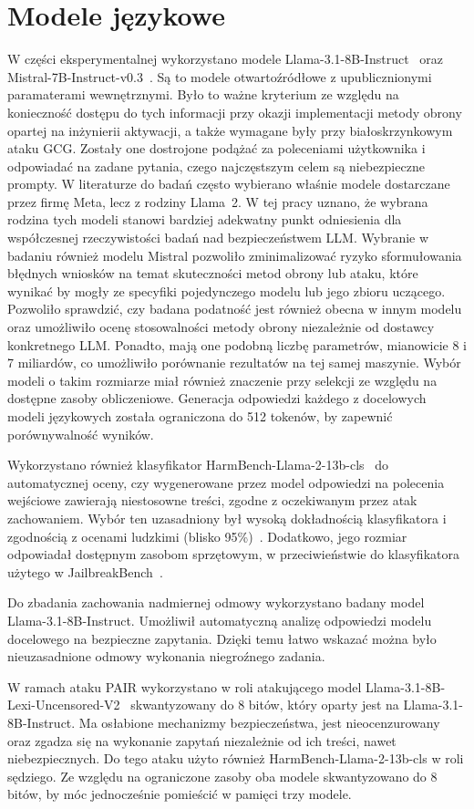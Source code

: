 \section{Modele językowe}
W części eksperymentalnej wykorzystano modele Llama-3.1-8B-Instruct~\cite{grattafiori2024llama3herdmodels} oraz Mistral-7B-Instruct-v0.3~\cite{jiang2023mistral7b}. Są to modele otwartoźródłowe z upublicznionymi paramaterami wewnętrznymi. Było to ważne kryterium ze względu na konieczność dostępu do tych informacji przy okazji implementacji metody obrony opartej na inżynierii aktywacji, a także wymagane były przy białoskrzynkowym ataku \gls{GCG}.
Zostały one dostrojone podążać za poleceniami użytkownika i odpowiadać na zadane pytania, czego najczęstszym celem są niebezpieczne prompty.
W literaturze do badań często wybierano właśnie modele dostarczane przez firmę Meta, lecz z rodziny Llama~2. W tej pracy uznano, że wybrana rodzina tych modeli stanowi bardziej adekwatny punkt odniesienia dla współczesnej rzeczywistości badań nad bezpieczeństwem \gls{LLM}.
Wybranie w badaniu również modelu Mistral pozwoliło zminimalizować ryzyko sformułowania błędnych wniosków na temat skuteczności metod obrony lub ataku, które wynikać by mogły ze specyfiki pojedynczego modelu lub jego zbioru uczącego.
Pozwoliło sprawdzić, czy badana podatność jest również obecna w innym modelu oraz umożliwiło ocenę stosowalności metody obrony niezależnie od dostawcy konkretnego \gls{LLM}. Ponadto, mają one podobną liczbę parametrów, mianowicie 8 i 7 miliardów, co umożliwiło porównanie rezultatów na tej samej maszynie.
Wybór modeli o takim rozmiarze miał również znaczenie przy selekcji ze względu na dostępne zasoby obliczeniowe.
Generacja odpowiedzi każdego z docelowych modeli językowych została ograniczona do 512 tokenów, by zapewnić porównywalność wyników.

Wykorzystano również klasyfikator HarmBench-Llama-2-13b-cls~\cite{mazeika2024harmbenchstandardizedevaluationframework} do automatycznej oceny, czy wygenerowane przez model odpowiedzi na polecenia wejściowe zawierają niestosowne treści, zgodne z oczekiwanym przez atak zachowaniem. Wybór ten uzasadniony był wysoką dokładnością klasyfikatora i zgodnością z ocenami ludzkimi (blisko 95\%)~\cite{mazeika2024harmbenchstandardizedevaluationframework}. Dodatkowo, jego rozmiar odpowiadał dostępnym zasobom sprzętowym, w przeciwieństwie do klasyfikatora użytego w JailbreakBench~\cite{chao2024jailbreakbenchopenrobustnessbenchmark}.

Do zbadania zachowania nadmiernej odmowy wykorzystano badany model Llama-3.1-8B-Instruct. Umożliwił automatyczną analizę odpowiedzi modelu docelowego na bezpieczne zapytania. Dzięki temu łatwo wskazać można było nieuzasadnione odmowy wykonania niegroźnego zadania.

W ramach ataku PAIR wykorzystano w roli atakującego model Llama-3.1-8B-Lexi-Uncensored-V2~\cite{orenguteng2024llama31lexi} skwantyzowany do 8 bitów, który oparty jest na Llama-3.1-8B-Instruct. Ma osłabione mechanizmy bezpieczeństwa, jest nieocenzurowany oraz zgadza się na wykonanie zapytań niezależnie od ich treści, nawet niebezpiecznych. Do tego ataku użyto również HarmBench-Llama-2-13b-cls w roli sędziego. Ze względu na ograniczone zasoby oba modele skwantyzowano do 8 bitów, by móc jednocześnie pomieścić w pamięci trzy modele.